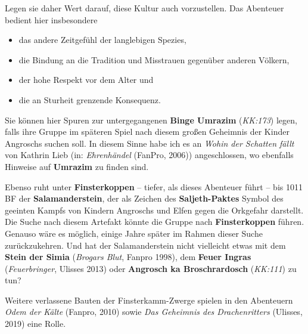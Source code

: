 Legen sie daher Wert darauf, diese Kultur auch vorzustellen. Das Abenteuer bedient hier insbesondere
\begin{itemize}
	\item das andere Zeitgefühl der langlebigen Spezies,
	\item die Bindung an die Tradition und Misstrauen gegenüber anderen Völkern,
	\item der hohe Respekt vor dem Alter und
	\item die an Sturheit grenzende Konsequenz.
\end{itemize}

Sie können hier  Spuren zur untergegangenen \textbf{Binge Umrazim} (\emph{KK:173}) legen,
falls ihre Gruppe im späteren Spiel nach diesem großen Geheimnis der Kinder Angroschs suchen soll.
In diesem Sinne habe ich es an \emph{Wohin der Schatten fällt} von Kathrin Lieb (in: \emph{Ehrenhändel} (FanPro, 2006)) angeschlossen,
wo ebenfalls Hinweise auf \textbf{Umrazim} zu finden sind.

Ebenso ruht unter \textbf{Finsterkoppen} -- tiefer, als dieses Abenteuer führt -- bis 1011 BF der \textbf{Salamanderstein}, der als Zeichen des \textbf{Saljeth-Paktes} Symbol des geeinten Kampfs von Kindern Angroschs und Elfen gegen die Orkgefahr darstellt.
Die Suche nach diesem Artefakt könnte die Gruppe nach \textbf{Finsterkoppen} führen.
Genauso wäre es möglich, einige Jahre später im Rahmen dieser Suche zurückzukehren.
Und hat der Salamanderstein nicht vielleicht etwas mit dem \textbf{Stein der Simia} (\emph{Brogars Blut}, Fanpro 1998), dem \textbf{Feuer Ingras} (\emph{Feuerbringer}, Ulisses 2013) oder \textbf{Angrosch ka Broschrardosch} (\emph{KK:111}) zu tun?

Weitere verlassene Bauten der Finsterkamm-Zwerge spielen in den Abenteuern \emph{Odem der Kälte} (Fanpro, 2010) sowie \emph{Das Geheimnis des Drachenritters} (Ulisses, 2019) eine Rolle.
\spaltenende

\neueseite

